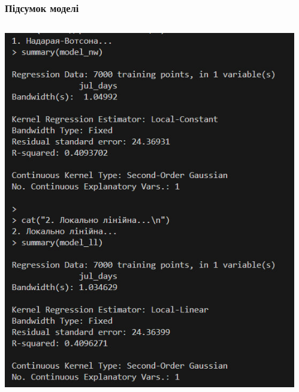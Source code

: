 ﻿\documentclass{beamer}
\begin{document}
\begin{frame}
  \frametitle{Підсумок моделі}
  \begin{columns}[T] 
  \begin{column}{0.48\textwidth} 
  \includegraphics[width=\textwidth]{plots/lab4/kernal/10.jpg}
  \end{column}
  \hfill
  \begin{column}{0.48\textwidth} 

\end{column}
\end{columns}
\end{frame}
\end{document}
